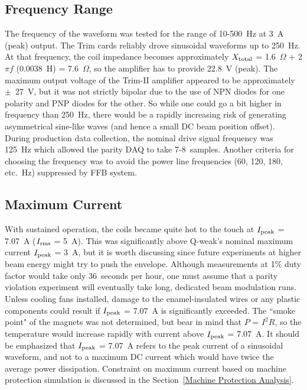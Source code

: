 \subsection{Frequency Range}
\label{Frequency Range}
The frequency of the waveform was tested for the range of 10-500~Hz at 3~A (peak) output. The Trim cards reliably drove sinusoidal waveforms up to 250~Hz. At that frequency, the coil impedance becomes approximately $X_{\rm total}$ = 1.6~$\Omega$ + 2$\pi f$ (0.0038~H) = 7.6~$\Omega$, so the amplifier has to provide 22.8~V (peak). The maximum output voltage of the Trim-II amplifier appeared to be approximately $\pm$~27~V, but it was not strictly bipolar due to the use of NPN diodes for one polarity and PNP diodes for the other. So while one could go a bit higher in frequency than 250~Hz, there would be a rapidly increasing risk of generating asymmetrical sine-like waves (and hence a small DC beam position offset). During production data collection, the nominal drive signal frequency was 125~Hz which allowed the parity DAQ to take 7-8~samples. Another criteria for choosing the frequency was to avoid the power line frequencies (60, 120, 180, etc.~Hz) suppressed by FFB system.

\subsection{Maximum Current}
\label{Maximum Current}
With sustained operation, the coils became quite hot to the touch at $I_{\rm peak}$ = 7.07~A ($I_{\rm rms}$ = 5~A). This was significantly above Q-weak's nominal maximum current $I_{\rm peak}$ = 3~A, but it is worth discussing since future experiments at higher beam energy might try to push the envelope. Although measurements at 1\% duty factor would take only 36~seconds per hour, one must assume that a parity violation experiment will eventually take long, dedicated beam modulation runs. Unless cooling fans installed, damage to the enamel-insulated wires or any plastic components could result if $I_{\rm peak}$ = 7.07~A is significantly exceeded. The ``smoke point" of the magnets was not determined, but bear in mind that $P$ = $I^{2}R$, so the temperature would increase rapidly with current above $I_{\rm peak}$ = 7.07~A. It should be emphasized that $I_{\rm peak}$ = 7.07~A refers to the peak current of a sinusoidal waveform, and not to a maximum DC current which would have twice the average power dissipation. Constraint on maximum current based on machine protection simulation is discussed in the Section~\ref{Machine Protection Analysis}.
 
